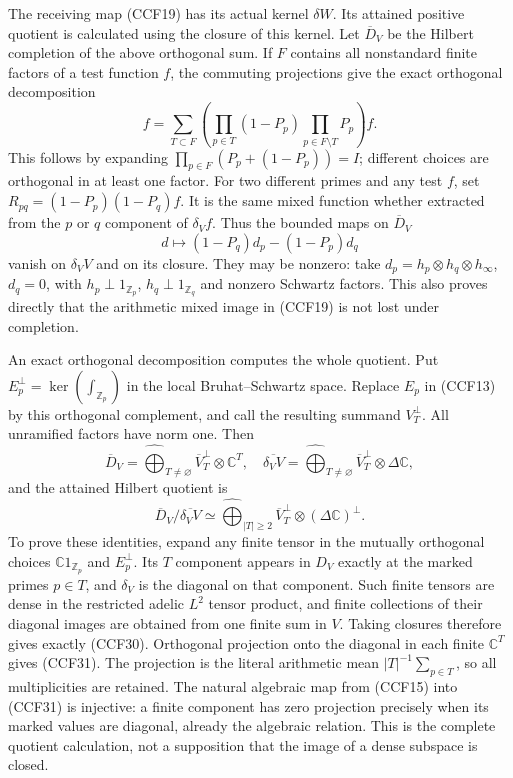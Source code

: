 The receiving map (CCF19) has its actual kernel $\delta W$.
Its attained positive quotient is calculated using the closure
of this kernel. Let $\overline D_V$ be the Hilbert completion
of the above orthogonal sum. If $F$ contains all nonstandard
finite factors of a test function $f$, the commuting projections
give the exact orthogonal decomposition
\[
 f=\sum_{T\subset F}
       \left(\prod_{p\in T}(1-P_p)\prod_{p\in F\setminus T}P_p\right)f.
 \tag{CCF28}
\]
This follows by expanding $\prod_{p\in F}(P_p+(1-P_p))=I$;
different choices are orthogonal in at least one factor.
For two different primes and any test $f$, set
$R_{pq}=(1-P_p)(1-P_q)f$. It is the same mixed function
whether extracted from the $p$ or $q$ component of $\delta_Vf$.
Thus the bounded maps on $\overline D_V$
\[
 d\longmapsto(1-P_q)d_p-(1-P_p)d_q
 \tag{CCF29}
\]
vanish on $\delta_VV$ and on its closure. They may be nonzero:
take $d_p=h_p\otimes h_q\otimes h_\infty$, $d_q=0$, with
$h_p\perp1_{\mathbb Z_p}$, $h_q\perp1_{\mathbb Z_q}$ and
nonzero Schwartz factors. This also proves directly that the
arithmetic mixed image in (CCF19) is not lost under completion.

An exact orthogonal decomposition computes the whole quotient.
Put $E_p^{\perp}=\ker(\int_{\mathbb Z_p})$ in the local
Bruhat--Schwartz space. Replace $E_p$ in (CCF13) by this
orthogonal complement, and call the resulting summand
$V_T^{\perp}$. All unramified factors have norm one. Then
\[
 \overline D_V=\widehat{\bigoplus}_{T\ne\varnothing}
                  \overline V_T^{\perp}\otimes\mathbb C^T,
 \quad
 \overline{\delta_VV}=\widehat{\bigoplus}_{T\ne\varnothing}
                  \overline V_T^{\perp}\otimes\Delta\mathbb C,
 \tag{CCF30}
\]
and the attained Hilbert quotient is
\[
 \overline D_V/\overline{\delta_VV}
   \simeq\widehat{\bigoplus}_{|T|\ge2}
      \overline V_T^{\perp}\otimes(\Delta\mathbb C)^{\perp}.
 \tag{CCF31}
\]
To prove these identities, expand any finite tensor in the
mutually orthogonal choices $\mathbb C1_{\mathbb Z_p}$ and
$E_p^\perp$. Its $T$ component appears in $D_V$ exactly at
the marked primes $p\in T$, and $\delta_V$ is the diagonal
on that component. Such finite tensors are dense in the
restricted adelic $L^2$ tensor product, and finite collections
of their diagonal images are obtained from one finite sum
in $V$. Taking closures therefore gives exactly (CCF30).
Orthogonal projection onto the diagonal in each finite
$\mathbb C^T$ gives (CCF31). The projection is the literal
arithmetic mean $|T|^{-1}\sum_{p\in T}$, so all multiplicities
are retained. The natural algebraic map from (CCF15) into
(CCF31) is injective: a finite component has zero projection
precisely when its marked values are diagonal, already the
algebraic relation. This is the complete quotient calculation,
not a supposition that the image of a dense subspace is closed.

